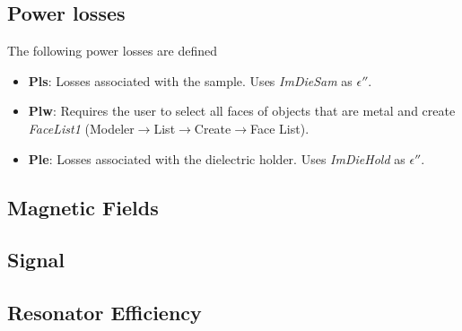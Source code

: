 \subsection*{Power losses}
The following power losses are defined
\begin{itemize}
    \item \textbf{Pls}: Losses associated with the sample. Uses \textit{ImDieSam} as $\epsilon''$.
    \item \textbf{Plw}: Requires the user to select all faces of objects that are metal and create \textit{FaceList1} (Modeler$\xrightarrow{}$List$\xrightarrow{}$Create$\xrightarrow{}$Face List).
    \item \textbf{Ple}: Losses associated with the dielectric holder. Uses \textit{ImDieHold} as $\epsilon''$.
\end{itemize}{}

\newpage

\subsection*{Magnetic Fields}

\newpage


\subsection*{Signal}

\newpage

\subsection*{Resonator Efficiency}
